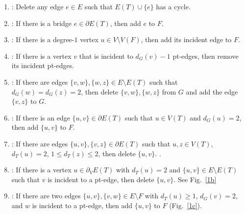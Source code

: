 \documentclass{llncs}
\newcommand{\redrule}[2]{\vspace*{1ex}{\bf #1}: #2}
\begin{document}
\begin{enumerate}\itemsep.5pt
\item \redrule{Cycle}{Delete any edge $e \in E$ such that $E(T)\cup\{e\}$ has a cycle.}
\item \redrule{Bridge}{If there is a bridge $e \in \partial E(T)$, then add $e$ to $F$. }
\item \redrule{Deg1}{If there is a degree-$1$ vertex $u \in V\setminus V(F)$, then add its incident edge to $F$. }
\item \redrule{Pending}{If there is a vertex $v$ that is incident to $d_G(v)-1$ pt-edges, then remove its incident pt-edges. }
\item \redrule{ConsDeg2}{If there are edges $\{v,w\},\{w,z\} \in E \setminus E(T)$ such that $d_G(w)=d_G(z)=2$, then delete $\{v,w\},\{w,z\}$ from $G$ and add the edge $\{v,z\}$ to $G$.}
\item \redrule{Deg2}{If there is an edge $\{u,v\} \in \partial E(T)$ such that $u \in V(T)$ and $d_G(u)=2$, then add $\{u,v\}$ to $F$.}
\item \redrule{Attach}{If there are edges $\{u,v\},\{v,z\} \in \partial E(T)$ such that $u,z \in V(T)$, $d_T(u)=2$, $1 \le d_T(z) \le 2$, then delete
$\{u,v\}$. .}
\item \redrule{Attach2}{If there is a vertex $u \in \partial_V E(T)$ with $d_T(u)=2$ and $\{u,v\} \in E \setminus  E(T)$ such that $v$ is incident to
a pt-edge, then delete $\{u,v\}$. See Fig.~\ref{1b}}
\item \redrule{Special}{If there are two edges $\{u,v\},\{v,w\} \in E \setminus F$ with  $d_T(u) \ge 1$, $d_G(v)=2$, and $w$ is incident to a pt-edge, then add $\{u,v\}$ to $F$ (Fig.~\ref{1c}). }
\end{enumerate}
\end{document}
